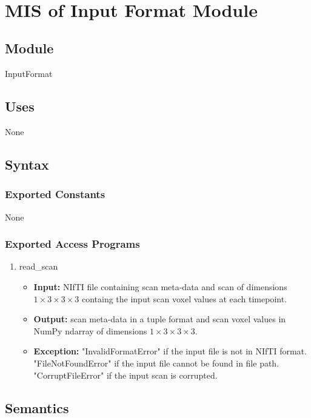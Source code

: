 \documentclass[12pt, titlepage]{article}
\begin{document}
\newpage
~\newpage

\section{MIS of Input Format Module} \label{IF}


\subsection{Module}

InputFormat

\subsection{Uses}
None
\subsection{Syntax}

\subsubsection{Exported Constants}
None

\subsubsection{Exported Access Programs}

\begin{enumerate}
  \item read\_scan
        \begin{itemize}
          \item \textbf{Input:} NIfTI file containing scan meta-data and scan of dimensions $ 1 \times 3 \times 3 \times 3$ containg the input scan voxel values at
                each timepoint.
          \item \textbf{Output:} scan meta-data in a tuple format and scan voxel values in NumPy ndarray of dimensions $ 1 \times 3 \times 3 \times 3$.
          \item \textbf{Exception:} "InvalidFormatError" if the input file is not in NIfTI format. "FileNotFoundError" if the input file cannot be found in file path.
                "CorruptFileError" if the input scan is corrupted.
        \end{itemize}
\end{enumerate}

\subsection{Semantics}
\end{document}
